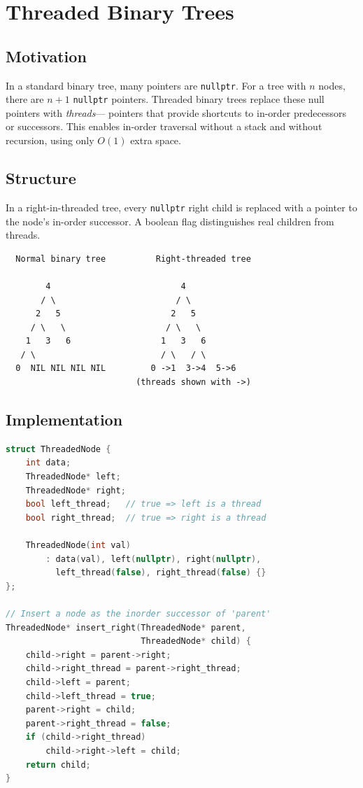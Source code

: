 \section{Threaded Binary Trees}

\subsection{Motivation}

In a standard binary tree, many pointers are \texttt{nullptr}.  For a
tree with $n$ nodes, there are $n + 1$ \texttt{nullptr} pointers.
Threaded binary trees replace these null pointers with \emph{threads}---
pointers that provide shortcuts to in-order predecessors or successors.
This enables in-order traversal without a stack and without recursion,
using only $O(1)$ extra space.

\subsection{Structure}

In a right-in-threaded tree, every \texttt{nullptr} right child is
replaced with a pointer to the node's in-order successor.  A boolean
flag distinguishes real children from threads.

\begin{center}
\begin{lstlisting}
  Normal binary tree          Right-threaded tree

        4                          4
       / \                        / \
      2   5                      2   5
     / \   \                    / \   \
    1   3   6                  1   3   6
   / \                         / \   / \
  0  NIL NIL NIL NIL         0 ->1  3->4  5->6
                          (threads shown with ->)
\end{lstlisting}
\end{center}

\subsection{Implementation}

\begin{lstlisting}[language=C++]
struct ThreadedNode {
    int data;
    ThreadedNode* left;
    ThreadedNode* right;
    bool left_thread;   // true => left is a thread
    bool right_thread;  // true => right is a thread

    ThreadedNode(int val)
        : data(val), left(nullptr), right(nullptr),
          left_thread(false), right_thread(false) {}
};

// Insert a node as the inorder successor of 'parent'
ThreadedNode* insert_right(ThreadedNode* parent,
                           ThreadedNode* child) {
    child->right = parent->right;
    child->right_thread = parent->right_thread;
    child->left = parent;
    child->left_thread = true;
    parent->right = child;
    parent->right_thread = false;
    if (child->right_thread)
        child->right->left = child;
    return child;
}
\end{lstlisting}

